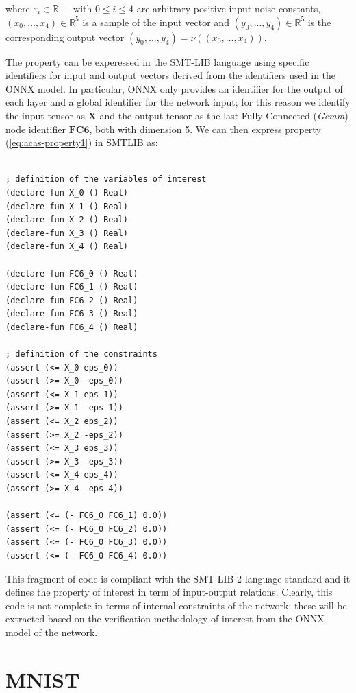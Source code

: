 where $\varepsilon_i \in \mathbb{R}+$ with $0 \leq i \leq 4$ are
arbitrary positive input noise constants, $(x_0, \ldots, x_4) 
\in \mathbb{R}^5$ is a sample of the input vector and 
$(y_0, \ldots, y_4) \in \mathbb{R}^5$ is the corresponding output
vector $(y_0, \ldots, y_4) = \nu((x_0, \ldots, x_4))$.

The property can be experessed in the SMT-LIB language using
specific identifiers for input and output vectors derived from
the identifiers used in the ONNX model. In particular, ONNX only
provides an identifier for the output of each layer and a global 
identifier for the network input; for this reason we identify the 
input tensor as $\mathbf{X}$ and the output tensor as the last 
Fully Connected (\textit{Gemm}) node identifier $\mathbf{FC6}$, 
both with dimension 5. We can then express property 
(\ref{eq:acas-property1}) in SMTLIB as:
\begin{lstlisting}
	
; definition of the variables of interest
(declare-fun X_0 () Real)
(declare-fun X_1 () Real)
(declare-fun X_2 () Real)
(declare-fun X_3 () Real)
(declare-fun X_4 () Real)

(declare-fun FC6_0 () Real)
(declare-fun FC6_1 () Real)
(declare-fun FC6_2 () Real)
(declare-fun FC6_3 () Real)
(declare-fun FC6_4 () Real)

; definition of the constraints
(assert (<= X_0 eps_0))
(assert (>= X_0 -eps_0))
(assert (<= X_1 eps_1))
(assert (>= X_1 -eps_1))
(assert (<= X_2 eps_2))
(assert (>= X_2 -eps_2))
(assert (<= X_3 eps_3))
(assert (>= X_3 -eps_3))
(assert (<= X_4 eps_4))
(assert (>= X_4 -eps_4))

(assert (<= (- FC6_0 FC6_1) 0.0))
(assert (<= (- FC6_0 FC6_2) 0.0))
(assert (<= (- FC6_0 FC6_3) 0.0))
(assert (<= (- FC6_0 FC6_4) 0.0))
\end{lstlisting}
This fragment of code is compliant with the SMT-LIB 2 language standard
and it defines the property of interest in term of input-output
relations.  Clearly, this code is not complete in terms of internal
constraints of the network: these will be extracted based on the
verification methodology of interest from the ONNX model of the network.

\section{MNIST}


